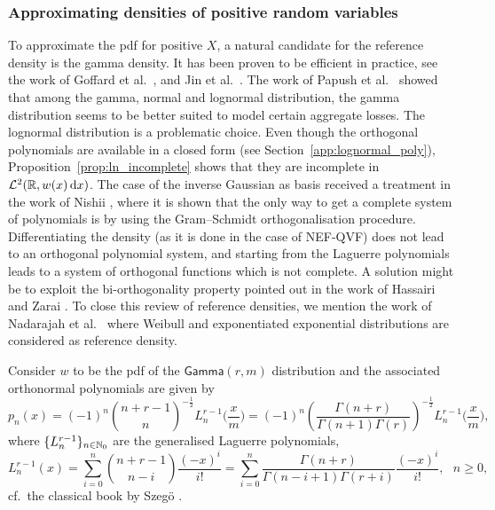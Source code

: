 \subsubsection{Approximating densities of positive random variables} \label{ssec:PolynomialApproxPositive}

To approximate the pdf for positive $X$, a natural candidate for the reference density is the gamma density. It has been proven to be efficient in practice, see the work of Goffard et al.\ \cite{GoLoPo15,GoLoPo16}, and Jin et al.\ \cite{JiPrRe16}. The work of Papush et al.\ \cite{PaPaPo01} showed that among the gamma, normal and lognormal distribution, the gamma distribution seems to be better suited to model certain aggregate losses. The lognormal distribution is a problematic choice. Even though the orthogonal polynomials are available in a closed form (see Section~\ref{app:lognormal_poly}), Proposition~\ref{prop:ln_incomplete} shows that they are incomplete in $\mathcal{L}^2(\mathbb{R}, w(x) \mathop{}\!\mathrm{d} x)$. The case of the inverse Gaussian as basis received a treatment in the work of Nishii \cite{Ni96}, where it is shown that the only way to get a complete system of polynomials is by using the Gram--Schmidt orthogonalisation procedure. Differentiating the density (as it is done in the case of NEF-QVF) does not lead to an orthogonal polynomial system, and starting from the Laguerre polynomials leads to a system of orthogonal functions which is not complete. A solution might be to exploit the bi-orthogonality property pointed out in the work of Hassairi and Zarai \cite{HaZa04}. To close this review of reference densities, we mention the work of Nadarajah et al.\ \cite{NaChJi16} where Weibull and exponentiated exponential distributions are considered as reference density.

Consider $w$ to be the pdf of the $\mathsf{Gamma}(r,m)$ distribution
and the associated orthonormal polynomials are given by
\begin{equation*}\label{eq:GeneralizedLaguerrePolynomials}
p_{n}(x)
=(-1)^{n} \binom{n + r - 1}{n}^{-\frac12} L_{n}^{r-1}\big(\frac{x}{m}\big)
=(-1)^{n} \left( \frac{\Gamma(n+r)}{\Gamma(n+1)\Gamma(r)} \right)^{-\frac12} L_{n}^{r-1}\big(\frac{x}{m}\big),
\end{equation*}
where $\{L_{n}^{r-1}\}_{n\in\mathbb{N}_0}$ are the generalised Laguerre polynomials,
\begin{equation*}\label{eq:GeneralizedLaguerrePolynomialsExpression}
L_{n}^{r-1}(x)
=\sum_{i=0}^{n} \binom{n + r - 1}{n - i} \frac{(-x)^i}{i!}
=\sum_{i=0}^{n} \frac{\Gamma(n+r)}{\Gamma(n-i+1)\Gamma(r+i)}\frac{(-x)^i}{i!}, \text{ }n\geq 0,
\end{equation*}
cf.\ the classical book by Szeg{\"o} \cite{Szegoe1939}. %

